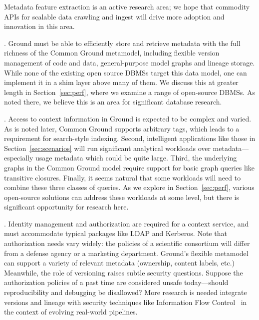 \documentclass{sig-alternate}
\begin{document}
Metadata feature extraction is an active research area; we hope that commodity APIs for scalable data crawling and ingest will drive more adoption and innovation in this area. 

.  Ground must be able to efficiently store and retrieve metadata with the full richness of the Common Ground metamodel, including flexible version management of code and data, general-purpose model graphs and lineage storage. 
While none of the existing open source DBMSs target this data model, one can implement it in a shim layer above many of them. 
We discuss this at greater length in Section~\ref{sec:perf}, where we examine a range of open-source DBMSs. As noted there, we believe this is an area for significant database research.

.  Access to context information in Ground is expected to be complex and varied. As is noted later, Common Ground supports arbitrary tags, which leads to a requirement for search-style indexing.
Second, intelligent applications like those in Section~\ref{sec:scenarios} will run significant analytical workloads over metadata---especially usage metadata which could be quite large.  
Third, the underlying graphs in the Common Ground model require support for basic graph queries like transitive closures. 
Finally, it seems natural that some workloads will need to combine these three classes of queries.
As we explore in Section~\ref{sec:perf}, various open-source solutions can address these workloads at some level, but there is significant opportunity for research here.

.  
Identity management and authorization are required for a context service, and must accommodate typical packages like LDAP and Kerberos.  
Note that authorization needs vary widely: the policies of a scientific consortium will differ from a defense agency or a marketing department.  
Ground's flexible metamodel can support a variety of relevant metadata (ownership, content labels, etc.) 
Meanwhile, the role of versioning raises
subtle security questions.
Suppose the authorization policies of a past time are considered unsafe today---should reproducibility and debugging be disallowed? 
More research is needed integrate
versions and lineage 
with security techniques like Information Flow Control~\cite{zeldovich2008securing} in the context of evolving real-world pipelines.
\end{document}

